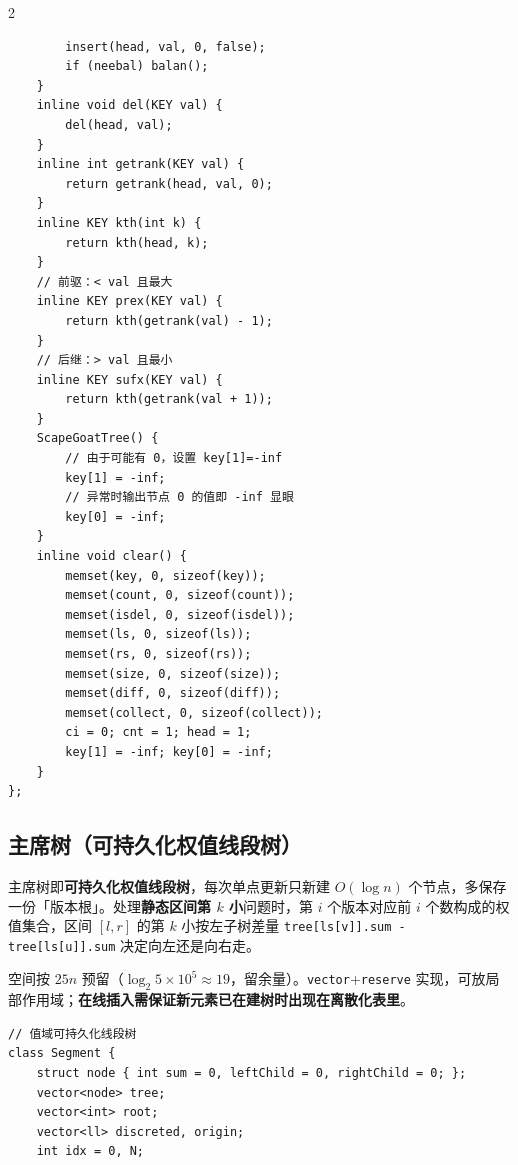 \begin{multicols*}{2}
\begin{verbatim}
        insert(head, val, 0, false);
        if (neebal) balan();
    }
    inline void del(KEY val) {
        del(head, val);
    }
    inline int getrank(KEY val) {
        return getrank(head, val, 0);
    }
    inline KEY kth(int k) {
        return kth(head, k);
    }
    // 前驱：< val 且最大
    inline KEY prex(KEY val) {
        return kth(getrank(val) - 1);
    }
    // 后继：> val 且最小
    inline KEY sufx(KEY val) {
        return kth(getrank(val + 1));
    }
    ScapeGoatTree() {
        // 由于可能有 0，设置 key[1]=-inf
        key[1] = -inf;
        // 异常时输出节点 0 的值即 -inf 显眼
        key[0] = -inf;
    }
    inline void clear() {
        memset(key, 0, sizeof(key));
        memset(count, 0, sizeof(count));
        memset(isdel, 0, sizeof(isdel));
        memset(ls, 0, sizeof(ls));
        memset(rs, 0, sizeof(rs));
        memset(size, 0, sizeof(size));
        memset(diff, 0, sizeof(diff));
        memset(collect, 0, sizeof(collect));
        ci = 0; cnt = 1; head = 1;
        key[1] = -inf; key[0] = -inf;
    }
};
		\end{verbatim}

		\subsection{主席树（可持久化权值线段树）}

		主席树即\textbf{可持久化权值线段树}，每次单点更新只新建 $O(\log n)$ 个节点，多保存一份「版本根」。处理\textbf{静态区间第 $k$ 小}问题时，第 $i$ 个版本对应前 $i$ 个数构成的权值集合，区间 $[l, r]$ 的第 $k$ 小按左子树差量 \verb|tree[ls[v]].sum - tree[ls[u]].sum| 决定向左还是向右走。

		空间按 $25n$ 预留（$\log_2 5\!\times\!10^5 \approx 19$，留余量）。\verb|vector|+\verb|reserve| 实现，可放局部作用域；\textbf{在线插入需保证新元素已在建树时出现在离散化表里}。

		\begin{verbatim}
// 值域可持久化线段树
class Segment {
    struct node { int sum = 0, leftChild = 0, rightChild = 0; };
    vector<node> tree;
    vector<int> root;
    vector<ll> discreted, origin;
    int idx = 0, N;


\end{verbatim}
\end{multicols*}
